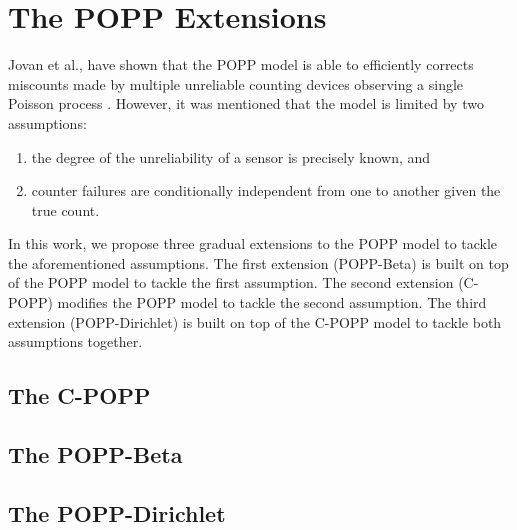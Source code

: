 \section{The POPP Extensions}
\label{sec:popp_extensions}

Jovan et al., have shown that the POPP model is able to efficiently corrects miscounts made by multiple unreliable counting devices observing a single Poisson process \cite{jovan18a} . However, it was mentioned that the model is limited by two assumptions:
\begin{enumerate}
    \item the degree of the unreliability of a sensor is precisely known, and
    \item counter failures are conditionally independent from one to another given the true count. 
\end{enumerate}
In this work, we propose three gradual extensions to the POPP model to tackle the aforementioned assumptions. The first extension (POPP-Beta) is built on top of the POPP model to tackle the first assumption. The second extension (C-POPP) modifies the POPP model to tackle the second assumption. The third extension (POPP-Dirichlet) is built on top of the C-POPP model to tackle both assumptions together. 

\subsection{The C-POPP}

\subsection{The POPP-Beta}

\subsection{The POPP-Dirichlet}
